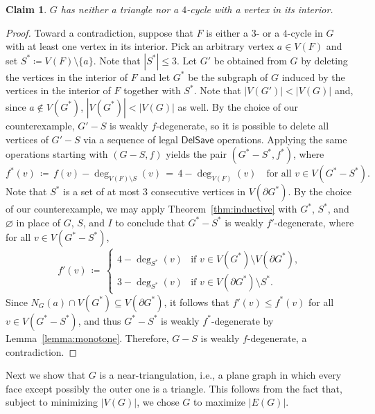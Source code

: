 \documentclass[11pt]{article}
\theoremstyle{slantthm}
\newtheorem{claim}{Claim}%
\numberwithin{equation}{section}
\theoremstyle{definition}
\renewcommand{\leq}{\leqslant}
\newcommand{\defeq}{\coloneqq}
\numberwithin{equation}{section}
\newcommand{\0}{\varnothing}
\newcommand{\set}[1]{\{#1\}}
\newcommand{\emphd}[1]{{\fontseries{b}\selectfont\textsf{#1}}}
\newcommand{\delsave}{\mathsf{DelSave}}
\newcommand{\bdry}[1]{{\partial #1}}
\begin{document}
\begin{claim}\label{claim:cycles}\label{claim:triangles}\label{claim:4cycles}
        $G$ has neither a triangle nor a $4$-cycle with a vertex in its interior.
\end{claim}
    \begin{proof}
        Toward a contradiction, suppose that $F$ is either a $3$- or a $4$-cycle in $G$ with at least one vertex in its interior. Pick an arbitrary vertex $a \in V(F)$ and set $S^* \defeq V(F) \setminus \set{a}$. Note that $|S^*| \leq 3$. Let $G'$ be obtained from $G$ by deleting the vertices in the interior of $F$ and let $G^*$ be the subgraph of $G$ induced by the vertices in the interior of $F$ together with $S^*$. Note that $|V(G')| < |V(G)|$ and, since $a \notin V(G^*)$, $|V(G^*)| < |V(G)|$ as well. %
 By the choice of our counterexample, $G'-S$ is weakly $f$-degenerate, so it is possible to delete all vertices of $G'-S$ via a sequence of legal $\delsave$ operations. Applying the same operations starting with $(G - S,f)$ yields the pair $(G^*-S^*, f^*)$, where %
 \[f^*(v) \,\defeq\, f(v) - \deg_{V(F)\setminus S}(v) \,=\, 4 - \deg_{V(F)}(v) \quad \text{for all } v \in V(G^* - S^*).\]
    Note that $S^*$ is a set of at most $3$ consecutive vertices in $V(\bdry{G^*})$. By the choice of our counterexample, we may apply Theorem~\ref{thm:inductive} with $G^*$, $S^*$, and $\0$ in place of $G$, $S$, and $I$ to conclude that $G^* - S^*$ is weakly $f'$-degenerate, where for all $v \in V(G^* - S^*)$,
        \[
        f'(v) \,\defeq\, \begin{cases}
            4 - \deg_{S^*}(v) &\text{if } v \in V(G^*) \setminus V(\bdry{G^*}),\\
            3 - \deg_{S^*}(v) &\text{if } v \in V(\bdry{G^*}) \setminus S^*.
        \end{cases}
     \]
     Since $N_G(a) \cap V(G^*) \subseteq V(\bdry{G^*})$, it follows that $f'(v) \leq f^*(v)$ for all $v \in V(G^* - S^*)$, and thus $G^* - S^*$ is weakly $f^*$-degenerate by Lemma~\ref{lemma:monotone}. Therefore, $G - S$ is weakly $f$-degenerate, a contradiction.
    \end{proof}

    Next we show that $G$ is a \emphd{near-triangulation}, i.e., a plane graph in which every face except possibly the outer one is a triangle. This follows from the fact that, subject to minimizing $|V(G)|$, we chose $G$ to maximize $|E(G)|$.
\end{document}
